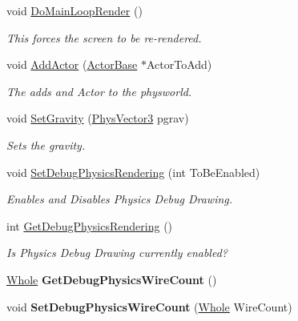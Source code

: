 \begin{DoxyCompactItemize}
void \hyperlink{classphys_1_1World_a34133dd084f575a51209458dbe9ecdac}{DoMainLoopRender} ()
\begin{DoxyCompactList}\small\item\em This forces the screen to be re-\/rendered. \item\end{DoxyCompactList}\item 
void \hyperlink{classphys_1_1World_a0fec41ef68b7bb1443aab927f8277a81}{AddActor} (\hyperlink{classphys_1_1ActorBase}{ActorBase} $\ast$ActorToAdd)
\begin{DoxyCompactList}\small\item\em The adds and Actor to the physworld. \item\end{DoxyCompactList}\item 
void \hyperlink{classphys_1_1World_a3779f811ca8a394a20fc2d92823b5f93}{SetGravity} (\hyperlink{classPhysVector3}{PhysVector3} pgrav)
\begin{DoxyCompactList}\small\item\em Sets the gravity. \item\end{DoxyCompactList}\item 
void \hyperlink{classphys_1_1World_a9fbd112d2677aa948301287d541b64bb}{SetDebugPhysicsRendering} (int ToBeEnabled)
\begin{DoxyCompactList}\small\item\em Enables and Disables Physics Debug Drawing. \item\end{DoxyCompactList}\item 
int \hyperlink{classphys_1_1World_a92070d16eb81866b4393f0ed96fbcbbc}{GetDebugPhysicsRendering} ()
\begin{DoxyCompactList}\small\item\em Is Physics Debug Drawing currently enabled? \item\end{DoxyCompactList}\item 
\hypertarget{classphys_1_1World_a1031d596580ac1a8d3593b5be9b49091}{
\hyperlink{namespacephys_a460f6bc24c8dd347b05e0366ae34f34a}{Whole} {\bfseries GetDebugPhysicsWireCount} ()}
\label{da/ddf/classphys_1_1World_a1031d596580ac1a8d3593b5be9b49091}

\item 
\hypertarget{classphys_1_1World_a17bd8fb9b23361f636df02638f89f767}{
void {\bfseries SetDebugPhysicsWireCount} (\hyperlink{namespacephys_a460f6bc24c8dd347b05e0366ae34f34a}{Whole} WireCount)}
\label{da/ddf/classphys_1_1World_a17bd8fb9b23361f636df02638f89f767}

\end{DoxyCompactItemize}
